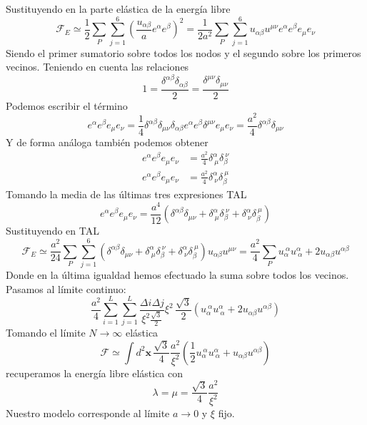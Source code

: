 Sustituyendo en la parte elástica de la energía libre
\begin{equation}
\mathcal{F}_E\simeq \frac{1}{2}\sum_{P} \sum^6_{j=1} \left(\frac{u_{\alpha\beta}}{a}e^{\alpha}e^{\beta}\right)^2=\frac{1}{2a^2}\sum_{P} \sum^6_{j=1} u_{\alpha\beta}u^{\mu\nu}e^{\alpha}e^{\beta}e_{\mu}e_{\nu}
\end{equation}
Siendo el primer sumatorio sobre todos los nodos y el segundo sobre los
primeros vecinos. Teniendo en cuenta las relaciones
\begin{equation}
1=\frac{\delta^{\alpha\beta}\delta_{\alpha\beta}}{2}=\frac{\delta^{\mu\nu}\delta_{\mu\nu}}{2}
\end{equation}
Podemos escribir el término
\begin{equation}
e^{\alpha}e^{\beta}e_{\mu}e_{\nu}=\frac{1}{4}\delta^{\alpha\beta}\delta_{\mu\nu}\delta_{\alpha\beta}e^{\alpha}e^{\beta}\delta^{\mu\nu}e_{\mu}e_{\nu}=\frac{a^2}{4}\delta^{\alpha\beta}\delta_{\mu\nu}
\end{equation}
Y de forma análoga también podemos obtener
\begin{align}
e^{\alpha}e^{\beta}e_{\mu}e_{\nu}&=\frac{a^2}{4}\delta^{\alpha}_{\ \mu}\delta_{\beta}^{\
  \nu}\\
e^{\alpha}e^{\beta}e_{\mu}e_{\nu}&=\frac{a^2}{4}\delta^{\alpha}_{\ \nu}\delta_{\beta}^{\
  \mu}
\end{align}
Tomando la media de las últimas tres expresiones TAL
\begin{equation}
e^{\alpha}e^{\beta}e_{\mu}e_{\nu}=\frac{a^4}{12}(\delta^{\alpha\beta}\delta_{\mu\nu}+
\delta^{\alpha}_{\ \mu}\delta_{\beta}^{\ \nu}+
\delta^{\alpha}_{\ \nu}\delta_{\beta}^{\ \mu})
\end{equation}
Sustituyendo en TAL
\begin{equation}
\mathcal{F}_E\simeq\frac{a^2}{24}\sum_{P} \sum^6_{j=1}(\delta^{\alpha\beta}\delta_{\mu\nu}+\delta^{\alpha}_{\ \mu}\delta_{\beta}^{\ \nu}+
\delta^{\alpha}_{\ \nu}\delta_{\beta}^{\ \mu})
u_{\alpha\beta}u^{\mu\nu}=\frac{a^2}{4}\sum_{P}u_{\alpha}^{\ \alpha}u^{\alpha}_{\ \alpha}+2u_{\alpha\beta}u^{\alpha\beta}
\end{equation}
Donde en  la última igualdad hemos efectuado la suma sobre todos los vecinos.
Pasamos al límite continuo:
\begin{equation}
\frac{a^2}{4}\sum_{i=1}^L\sum_{j=1}^L\frac{\Delta i\Delta j}{\xi^2\frac{\sqrt{3}}{2}}\xi^2\,\frac{\sqrt{3}}{2}(u_{\alpha}^{\ \alpha}u^{\alpha}_{\ \alpha}+2u_{\alpha\beta}u^{\alpha\beta})
\end{equation}
Tomando el límite $N\rightarrow \infty$
elástica 
\begin{equation}
\mathcal{F}\simeq\int d^2\mathbf{x}\, \frac{\sqrt{3}}{4}\frac{a^2}{\xi^2}\left(\frac{1}{2}u_{\alpha}^{\ \alpha}u^{\alpha}_{\ \alpha}+u_{\alpha\beta}u^{\alpha\beta}\right)
\end{equation}
recuperamos la energía libre elástica con 
\begin{equation}
\lambda=\mu=\frac{\sqrt{3}}{4}\frac{a^2}{\xi^2}
\end{equation}
Nuestro modelo corresponde al límite $a\rightarrow 0$ y $\xi$ fijo.

